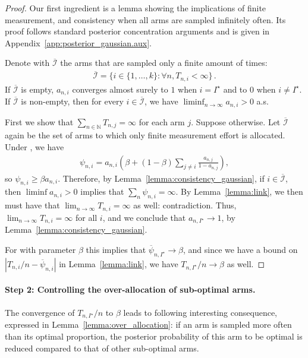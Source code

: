 \begin{proof} Our first ingredient is a lemma showing the implications of finite measurement, and consistency when all arms are sampled infinitely often. Its proof follows standard posterior concentration arguments and is given in Appendix~\ref{app:posterior_gaussian.aux}.

\begin{lemma}\label{lemma:consistency_gaussian}
\begin{leftbar}
	Denote with $\overline{\mathcal{I}}$ the arms that are sampled only a finite amount of times:
	\begin{align*}
	\overline{\mathcal{I}} = \{ i \in \{ 1, \ldots, k \} : \forall n, T_{n,i} < \infty \}\,.
	\end{align*}
	If $\overline{\mathcal{I}}$ is empty, $a_{n,i}$ converges almost surely to $1$ when $i = I^\star$ and to $0$ when $i \neq I^\star$. If $\overline{\mathcal{I}}$ is non-empty, then for every $i \in \overline{\mathcal{I}}$, we have $\liminf_{n \rightarrow \infty} a_{n,i} > 0$ a.s.
\end{leftbar}
\end{lemma}

	First we show that $\sum_{n \in \mathbb{N}} T_{n,j} = \infty$ for each arm $j$. Suppose otherwise. Let $\overline{\mathcal{I}}$ again be the set of arms to which only finite measurement effort is allocated. Under \TTTS, we have
	\begin{align*}
	\psi_{n,i} = a_{n,i} \left( \beta + (1-\beta) \sum_{j \neq i} \frac{a_{n,j}}{1- a_{n,j}} \right),
	\end{align*}
	so $ \psi_{n,i}  \geq \beta a_{n,i}$. Therefore, by Lemma~\ref{lemma:consistency_gaussian}, if $i \in \overline{\mathcal{I}}$, then $\liminf a_{n,i} > 0$ implies that $\sum_n \psi_{n,i} = \infty$. By Lemma~\ref{lemma:link}, we then must have that $\lim_{n \rightarrow \infty} T_{n,i} = \infty$ as well: contradiction.  Thus, $\lim_{n \rightarrow \infty} T_{n,i} = \infty$ for all $i$, and we conclude that $a_{n,I^\star} \rightarrow 1$, by Lemma~\ref{lemma:consistency_gaussian}. 
	
	For \TTTS with parameter $\beta$ this implies that $\overline{\psi}_{n, I^\star} \rightarrow \beta$, and since we have a bound on $| T_{n,i} / n - \overline{\psi}_{n, i} |$ in Lemma~\ref{lemma:link}, we have $T_{n, I^\star} / n \rightarrow \beta$ as well.
\end{proof}

\paragraph{Step 2:  Controlling the over-allocation of sub-optimal arms.}
The convergence of $T_{n,I^\star}/n$ to $\beta$ leads to following interesting consequence, expressed in Lemma~\ref{lemma:over_allocation}: if an arm is sampled more often than its optimal proportion, the posterior probability of this arm to be optimal is reduced compared to that of other sub-optimal arms.

